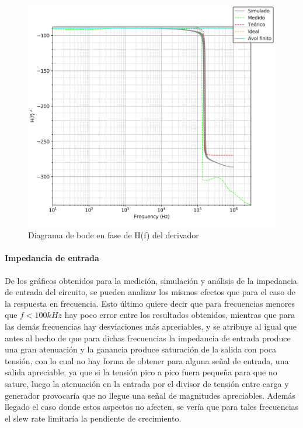\begin{figure}[H]
	\centering
	\includegraphics[scale=0.6]{../EJ4/Recursos/Derivador/bode_fase.png}
	\caption{Diagrama de bode en fase de H(f) del derivador}
	\label{fig:derivador_bode_fase}
\end{figure}

\paragraph*{Impedancia de entrada} De los gr\'aficos obtenidos para la medici\'on, simulaci\'on y an\'alisis de la impedancia
de entrada del circuito, se pueden analizar los mismos efectos que para el caso de la respuesta en frecuencia. Esto \'ultimo quiere decir que para frecuencias
menores que $f < 100kHz$ hay poco error entre los resultados obtenidos, mientras que para las dem\'as frecuencias hay desviaciones m\'as apreciables, y se atribuye
al igual que antes al hecho de que para dichas frecuencias la impedancia de entrada produce una gran atenuaci\'on y la ganancia produce saturaci\'on de la salida
con poca tensi\'on, con lo cual no hay forma de obtener para alguna se\~nal de entrada, una salida apreciable, ya que si la tensi\'on pico a pico fuera peque\~na para que no sature,
luego la atenuaci\'on en la entrada por el divisor de tensi\'on entre carga y generador provocar\'ia que no llegue una se\~nal de magnitudes apreciables. Adem\'as llegado el caso
donde estos aspectos no afecten, se ver\'ia que para tales frecuencias el slew rate limitar\'ia la pendiente de crecimiento.

